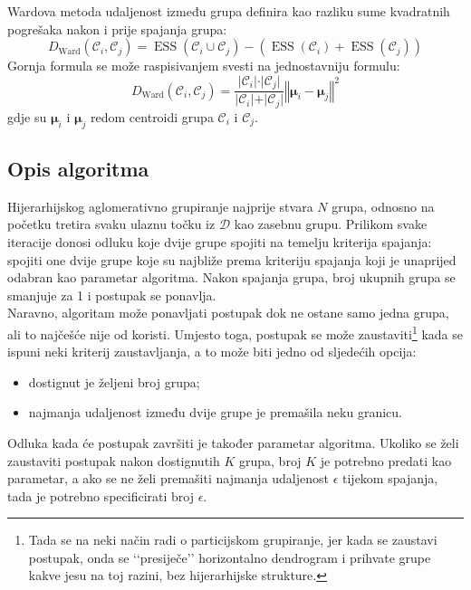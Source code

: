 \documentclass[times, utf8, zavrsni]{fer}
\begin{document}
Wardova metoda udaljenost između grupa definira kao razliku sume kvadratnih pogrešaka nakon i prije spajanja grupa:
\[D_{\text{Ward}} \left( \mathcal{C}_i, \mathcal{C}_j \right) 
= \operatorname{ESS} \left(\mathcal{C}_i \cup \mathcal{C}_j\right) - \left(\operatorname{ESS} \left(\mathcal{C}_i\right) + \operatorname{ESS} \left(\mathcal{C}_j\right)\right)
\]
Gornja formula se može raspisivanjem svesti na jednostavniju formulu:
\[D_{\text{Ward}} \left( \mathcal{C}_i, \mathcal{C}_j \right)
= \frac{\vert \mathcal{C}_i \vert \cdot \vert \mathcal{C}_j \vert}
{\vert \mathcal{C}_i \vert + \vert \mathcal{C}_j \vert}
\left\Vert \boldsymbol{\mu}_i - \boldsymbol{\mu}_j \right\Vert^2
\]
gdje su $\boldsymbol{\mu}_i$ i $\boldsymbol{\mu}_j$ redom centroidi grupa $\mathcal{C}_i$ i $\mathcal{C}_j$.

\subsection{Opis algoritma}
Hijerarhijskog aglomerativno grupiranje najprije stvara $N$ grupa, odnosno na početku tretira svaku ulaznu točku iz $\mathcal{D}$ kao zasebnu grupu. Prilikom svake iteracije donosi odluku koje dvije grupe spojiti na temelju kriterija spajanja: spojiti one dvije grupe koje su najbliže prema kriteriju spajanja koji je unaprijed odabran kao parametar algoritma. Nakon spajanja grupa, broj ukupnih grupa se smanjuje za 1 i postupak se ponavlja.\\
Naravno, algoritam može ponavljati postupak dok ne ostane samo jedna grupa, ali to najčešće nije od koristi. Umjesto toga, postupak se može zaustaviti\footnote{Tada se na neki način radi o particijskom grupiranje, jer kada se zaustavi postupak, onda se ‘‘presiječe’’ horizontalno dendrogram i prihvate grupe kakve jesu na toj razini, bez hijerarhijske strukture.} kada se ispuni neki kriterij zaustavljanja, a to može biti jedno od sljedećih opcija:
\begin{itemize}
    \item dostignut je željeni broj grupa;
    \item najmanja udaljenost između dvije grupe je premašila neku granicu.
\end{itemize}
Odluka kada će postupak završiti je također parametar algoritma. Ukoliko se želi zaustaviti postupak nakon dostignutih $K$ grupa, broj $K$ je potrebno predati kao parametar, a ako se ne želi premašiti najmanja udaljenost $\epsilon$ tijekom spajanja, tada je potrebno specificirati broj $\epsilon$.\\
\end{document}
